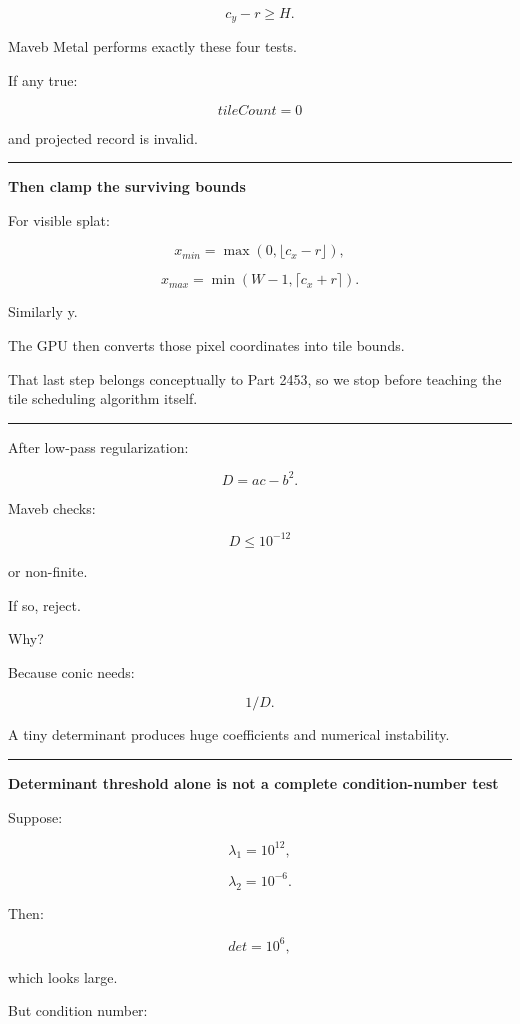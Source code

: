 \[
c_y-r\ge H.
\]

Maveb Metal performs exactly these four tests.

If any true:

\[
tileCount=0
\]

and projected record is invalid.

\begin{center}\rule{0.5\linewidth}{0.5pt}\end{center}

\textbf{Then clamp the surviving bounds}

For visible splat:

\[
x_{min}
=
\max(
0,
\lfloor c_x-r\rfloor
),
\]

\[
x_{max}
=
\min(
W-1,
\lceil c_x+r\rceil
).
\]

Similarly y.

The GPU then converts those pixel coordinates into tile bounds.

That last step belongs conceptually to Part 2453, so we stop before teaching the tile scheduling algorithm itself.

\begin{center}\rule{0.5\linewidth}{0.5pt}\end{center}

After low-pass regularization:

\[
D=
ac-b^2.
\]

Maveb checks:

\[
D\le10^{-12}
\]

or non-finite.

If so, reject.

Why?

Because conic needs:

\[
1/D.
\]

A tiny determinant produces huge coefficients and numerical instability.

\begin{center}\rule{0.5\linewidth}{0.5pt}\end{center}

\textbf{Determinant threshold alone is not a complete condition-number test}

Suppose:

\[
\lambda_1=10^{12},
\]

\[
\lambda_2=10^{-6}.
\]

Then:

\[
det=
10^6,
\]

which looks large.

But condition number:

